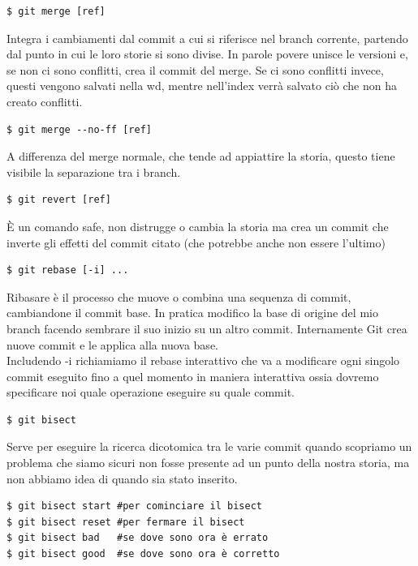\begin{verbatim}
$ git merge [ref]
\end{verbatim}
Integra i cambiamenti dal commit a cui si riferisce nel branch corrente, partendo dal punto in cui le loro storie si sono divise. In parole povere unisce le versioni e, se non ci sono conflitti, crea il commit del merge. Se ci sono conflitti invece, questi vengono salvati nella wd, mentre nell'index verrà salvato ciò che non ha creato conflitti.

\begin{verbatim}
$ git merge --no-ff [ref] 
\end{verbatim}
A differenza del merge normale, che tende ad appiattire la storia, questo tiene visibile la separazione tra i branch.

\begin{verbatim}
$ git revert [ref]
\end{verbatim}
È un comando safe, non distrugge o cambia la storia ma crea un commit che inverte gli effetti del commit citato (che potrebbe anche non essere l'ultimo)

\begin{verbatim}
$ git rebase [-i] ...
\end{verbatim}
Ribasare è il processo che muove o combina una sequenza di commit, cambiandone il commit base. In pratica modifico la base di origine del mio branch facendo sembrare il suo inizio su un altro commit.
Internamente Git crea nuove commit e le applica alla nuova base. \\
Includendo -i richiamiamo il rebase interattivo che va a modificare ogni singolo commit eseguito fino a quel momento in maniera interattiva ossia dovremo specificare noi quale operazione eseguire su quale commit.

\begin{verbatim}
$ git bisect
\end{verbatim}
Serve per eseguire la ricerca dicotomica tra le varie commit quando scopriamo un problema che siamo sicuri non fosse presente ad un punto della nostra storia, ma non abbiamo idea di quando sia stato inserito.\\

\begin{verbatim}
$ git bisect start #per cominciare il bisect
$ git bisect reset #per fermare il bisect
$ git bisect bad   #se dove sono ora è errato
$ git bisect good  #se dove sono ora è corretto
\end{verbatim}

